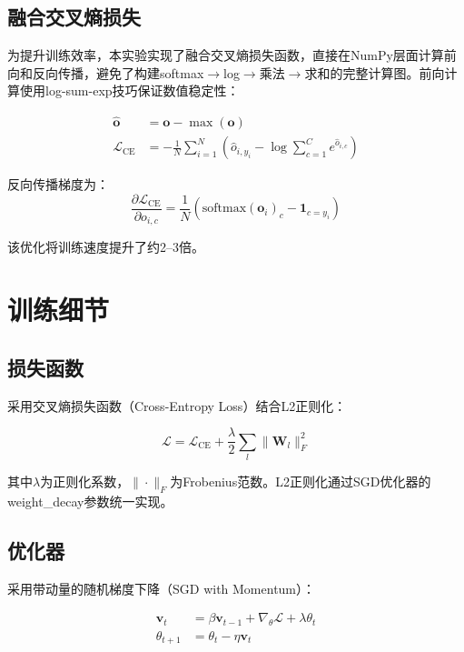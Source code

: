 \documentclass[12pt,a4paper]{article}
\begin{document}
\subsection{融合交叉熵损失}

为提升训练效率，本实验实现了融合交叉熵损失函数，直接在NumPy层面计算前向和反向传播，避免了构建softmax$\to$log$\to$乘法$\to$求和的完整计算图。前向计算使用log-sum-exp技巧保证数值稳定性：

\begin{align}
    \hat{\mathbf{o}} &= \mathbf{o} - \max(\mathbf{o}) \\
    \mathcal{L}_{\text{CE}} &= -\frac{1}{N}\sum_{i=1}^{N}\left(\hat{o}_{i,y_i} - \log\sum_{c=1}^{C}e^{\hat{o}_{i,c}}\right)
\end{align}

反向传播梯度为：
\begin{equation}
    \frac{\partial \mathcal{L}_{\text{CE}}}{\partial o_{i,c}} = \frac{1}{N}\left(\text{softmax}(\mathbf{o}_i)_c - \mathbf{1}_{c=y_i}\right)
\end{equation}

该优化将训练速度提升了约2--3倍。

\section{训练细节}

\subsection{损失函数}

采用交叉熵损失函数（Cross-Entropy Loss）结合L2正则化：

\begin{equation}
    \mathcal{L} = \mathcal{L}_{\text{CE}} + \frac{\lambda}{2} \sum_{l} \|\mathbf{W}_l\|_F^2
\end{equation}

其中$\lambda$为正则化系数，$\|\cdot\|_F$为Frobenius范数。L2正则化通过SGD优化器的weight\_decay参数统一实现。

\subsection{优化器}

采用带动量的随机梯度下降（SGD with Momentum）：

\begin{align}
    \mathbf{v}_t &= \beta \mathbf{v}_{t-1} + \nabla_{\theta} \mathcal{L} + \lambda \theta_t \\
    \theta_{t+1} &= \theta_t - \eta \mathbf{v}_t
\end{align}
\end{document}
